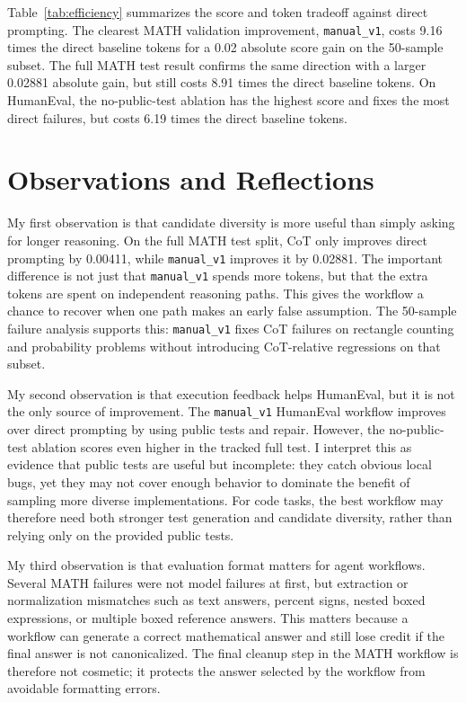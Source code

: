 \documentclass{article}
\begin{document}
Table~\ref{tab:efficiency} summarizes the score and token tradeoff against direct prompting. The clearest MATH validation improvement, \texttt{manual\_v1}, costs 9.16 times the direct baseline tokens for a 0.02 absolute score gain on the 50-sample subset. The full MATH test result confirms the same direction with a larger 0.02881 absolute gain, but still costs 8.91 times the direct baseline tokens. On HumanEval, the no-public-test ablation has the highest score and fixes the most direct failures, but costs 6.19 times the direct baseline tokens.

\section{Observations and Reflections}

My first observation is that candidate diversity is more useful than simply asking for longer reasoning. On the full MATH test split, CoT only improves direct prompting by 0.00411, while \texttt{manual\_v1} improves it by 0.02881. The important difference is not just that \texttt{manual\_v1} spends more tokens, but that the extra tokens are spent on independent reasoning paths. This gives the workflow a chance to recover when one path makes an early false assumption. The 50-sample failure analysis supports this: \texttt{manual\_v1} fixes CoT failures on rectangle counting and probability problems without introducing CoT-relative regressions on that subset.

My second observation is that execution feedback helps HumanEval, but it is not the only source of improvement. The \texttt{manual\_v1} HumanEval workflow improves over direct prompting by using public tests and repair. However, the no-public-test ablation scores even higher in the tracked full test. I interpret this as evidence that public tests are useful but incomplete: they catch obvious local bugs, yet they may not cover enough behavior to dominate the benefit of sampling more diverse implementations. For code tasks, the best workflow may therefore need both stronger test generation and candidate diversity, rather than relying only on the provided public tests.

My third observation is that evaluation format matters for agent workflows. Several MATH failures were not model failures at first, but extraction or normalization mismatches such as text answers, percent signs, nested boxed expressions, or multiple boxed reference answers. This matters because a workflow can generate a correct mathematical answer and still lose credit if the final answer is not canonicalized. The final cleanup step in the MATH workflow is therefore not cosmetic; it protects the answer selected by the workflow from avoidable formatting errors.
\end{document}
